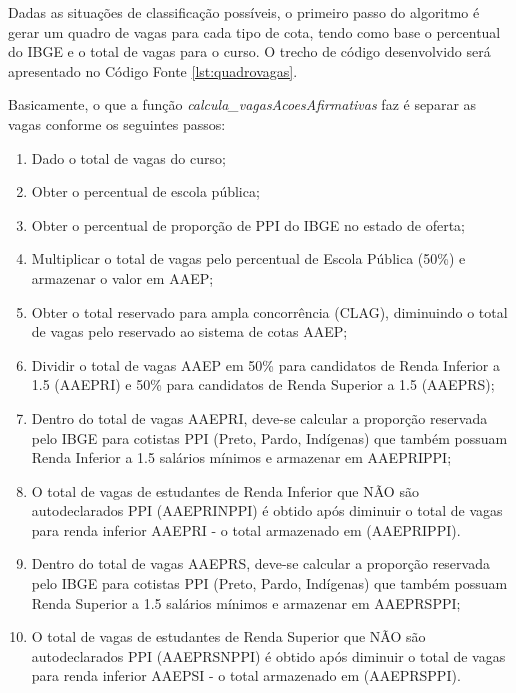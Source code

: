 

\newpage
Dadas as situações de classificação possíveis, o primeiro passo do algoritmo é gerar um quadro de vagas para cada tipo de cota, tendo como base o percentual do \gls{IBGE} e o total de vagas para o curso. O trecho de código desenvolvido será apresentado no Código Fonte \ref{lst:quadrovagas}.




Basicamente, o que a função \textit{calcula\_vagasAcoesAfirmativas} faz é separar as vagas conforme os seguintes passos:

\begin{enumerate}
    \item Dado o total de vagas do curso;
    \item Obter o percentual de escola pública;
    \item Obter o percentual de proporção de PPI do IBGE no estado de oferta;
    \item Multiplicar o total de vagas pelo percentual de Escola Pública (50\%) e armazenar o valor em AAEP;
    \item Obter o total reservado para ampla concorrência (CLAG), diminuindo o total de vagas pelo reservado ao sistema de cotas AAEP;
    \item Dividir o total de vagas AAEP em 50\% para candidatos de Renda Inferior a 1.5 (AAEPRI) e 50\% para candidatos de Renda Superior a 1.5 (AAEPRS);
    \item Dentro do total de vagas AAEPRI, deve-se calcular a proporção reservada pelo IBGE para cotistas PPI (Preto, Pardo, Indígenas) que também possuam Renda Inferior a 1.5 salários mínimos e armazenar em AAEPRIPPI;
    \item O total de vagas de estudantes de Renda Inferior que NÃO são autodeclarados PPI (AAEPRINPPI) é obtido após diminuir o total de vagas para renda inferior AAEPRI - o total armazenado em (AAEPRIPPI).
    \item Dentro do total de vagas AAEPRS, deve-se calcular a proporção reservada pelo IBGE para cotistas PPI (Preto, Pardo, Indígenas) que também possuam Renda Superior a 1.5 salários mínimos e armazenar em AAEPRSPPI;
    \item O total de vagas de estudantes de Renda Superior que NÃO são autodeclarados PPI (AAEPRSNPPI) é obtido após diminuir o total de vagas para renda inferior AAEPSI - o total armazenado em (AAEPRSPPI).
\end{enumerate}{}


